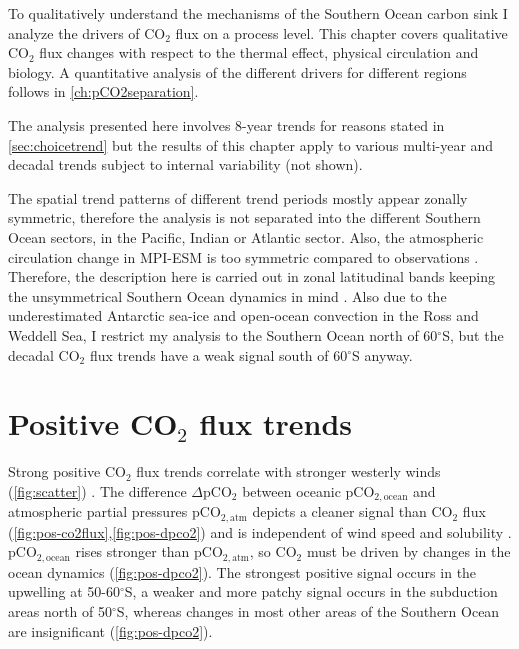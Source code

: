 To qualitatively understand the mechanisms of the Southern Ocean carbon sink I analyze the drivers of CO$_2$ flux on a process level. This chapter covers qualitative CO$_2$ flux changes with respect to the thermal effect, physical circulation and biology. A quantitative analysis of the different drivers for different regions follows in \autoref{ch:pCO2separation}.

The analysis presented here involves 8-year trends for reasons stated in \autoref{sec:choicetrend} but the results of this chapter apply to various multi-year and decadal trends subject to internal variability (not shown).

The spatial trend patterns of different trend periods mostly appear zonally symmetric, therefore the analysis is not separated into the different Southern Ocean sectors, \eg in the Pacific, Indian or Atlantic sector. Also, the atmospheric circulation change in \acs{MPI-ESM} is too symmetric compared to observations \citep{Haumann2014}. Therefore, the description here is carried out in zonal latitudinal bands keeping the unsymmetrical Southern Ocean dynamics in mind \citep{Sallee2010,Talley2013}. Also due to the underestimated Antarctic sea-ice and open-ocean convection in the Ross and Weddell Sea, I restrict my analysis to the Southern Ocean north of 60$^\circ$S, but the decadal CO$_2$ flux trends have a weak signal south of 60$^\circ$S anyway. 



\clearpage

\section{Positive CO$_2$ flux trends}
\label{sec:trends_pos}

Strong positive CO$_2$ flux trends correlate with stronger westerly winds (\autoref{fig:scatter}) \citep{Lovenduski2007}. The difference $\Delta$pCO$_2$ between oceanic pCO$_{2,\text{ocean}}$ and atmospheric partial pressures pCO$_{2,\text{atm}}$ depicts a cleaner signal than CO$_2$ flux (\autoref{fig:pos-co2flux},\ref{fig:pos-dpco2}) and is independent of wind speed and solubility \citep{Lovenduski2015}. pCO$_{2,\text{ocean}}$ rises stronger than pCO$_{2,\text{atm}}$, so CO$_2$ must be driven by changes in the ocean dynamics (\autoref{fig:pos-dpco2}).
The strongest positive signal occurs in the upwelling at 50-60$^\circ$S, a weaker and more patchy signal occurs in the subduction areas north of 50$^\circ$S, whereas changes in most other areas of the Southern Ocean are insignificant (\autoref{fig:pos-dpco2}). 

